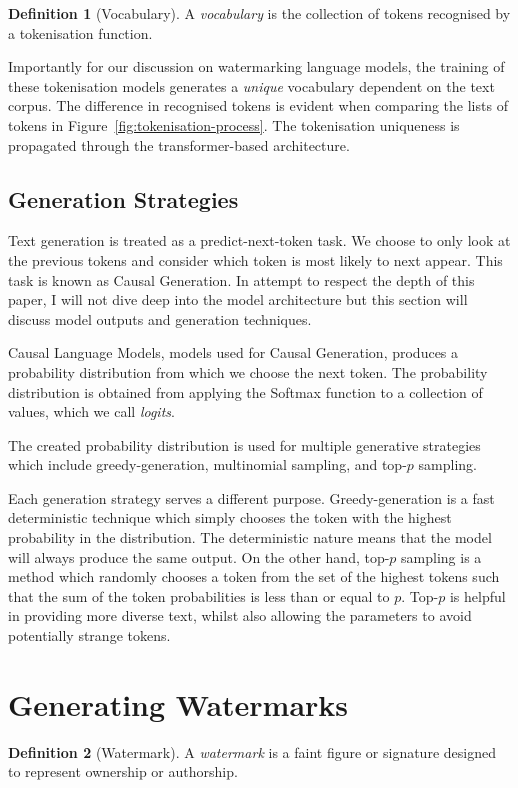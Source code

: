 \documentclass{l4proj}
\theoremstyle{definition}
\newtheorem{definition}{Definition}[section]
\begin{document}
        \begin{definition}[Vocabulary]
            A \emph{vocabulary} is the collection of tokens recognised by a tokenisation function.
        \end{definition}

        Importantly for our discussion on watermarking language models, the training of these tokenisation models generates a \emph{unique} vocabulary dependent on the text corpus. The difference in recognised tokens is evident when comparing the lists of tokens in Figure~\ref{fig:tokenisation-process}. The tokenisation uniqueness is propagated through the transformer-based architecture.

        
    
    \subsection{Generation Strategies}
        \label{sec:decoder-generation}
        Text generation is treated as a predict-next-token task. We choose to only look at the previous tokens and consider which token is most likely to next appear. This task is known as Causal Generation. In attempt to respect the depth of this paper, I will not dive deep into the model architecture but this section will discuss model outputs and generation techniques.

        Causal Language Models, models used for Causal Generation, produces a probability distribution from which we choose the next token. The probability distribution is obtained from applying the Softmax function to a collection of values, which we call \emph{logits}. 

        The created probability distribution is used for multiple generative strategies which include greedy-generation, multinomial sampling, and top-$p$ sampling.

        Each generation strategy serves a different purpose. Greedy-generation is a fast deterministic technique which simply chooses the token with the highest probability in the distribution. The deterministic nature means that the model will always produce the same output. On the other hand, top-$p$ sampling is a method which randomly chooses a token from the set of the highest tokens such that the sum of the token probabilities is less than or equal to $p$. Top-$p$ is helpful in providing more diverse text, whilst also allowing the parameters to avoid potentially strange tokens.

\section{Generating Watermarks}
    \begin{definition}[Watermark]
        A \emph{watermark} is a faint figure or signature designed to represent ownership or authorship.
    \end{definition}
\end{document}
